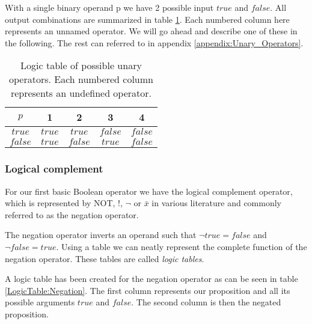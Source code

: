             With a single binary operand p we have 2 possible input $true$ and $false$. All output combinations are summarized in table \ref{LogicTable:unary}. Each numbered column here represents an unnamed operator. We will go ahead and describe one of these in the following. The rest can referred to in appendix \ref{appendix:Unary_Operators}. 
            
            \begin{table}[h!]
                \centering
                \begin{tabular}{|c||c|c|c|c|}
                	\hline
                	  $p$   &   1    &    2    &    3    & 4       \\ \hline
                	$true$  & $true$ & $true$  & $false$ & $false$ \\ \hline
                	$false$ & $true$ & $false$ & $true$  & $false$ \\ \hline
                \end{tabular}
                \caption{Logic table of possible unary operators. Each numbered column represents an undefined operator.}
                \label{LogicTable:unary}
            \end{table} 
        
            \subsubsection{Logical complement}
            
                For our first basic Boolean operator we have the logical complement operator, which is represented by NOT, !, $\neg$ or $\bar{x}$ in various literature and commonly referred to as the negation operator. 
                
                The negation operator inverts an operand such that $\neg true = false$ and $\neg false = true$.
                Using a table we can neatly represent the complete function of the negation operator. These tables are called \textit{logic tables}.
                
                A logic table has been created for the negation operator as can be seen in table \ref{LogicTable:Negation}.  The first column represents our proposition and all its possible arguments $true$ and $false$. The second column is then the negated proposition.
                
